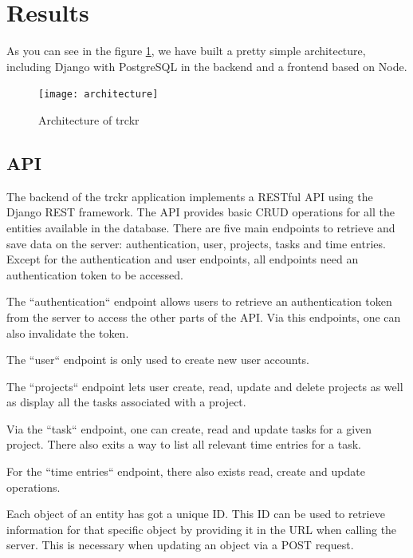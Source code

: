\documentclass[a4paper, 12pt, headsepline]{scrartcl}
\begin{document}
\section{Results}
As you can see in the figure \ref{fig:architecture}, we have built a pretty simple architecture,
including Django with PostgreSQL in the backend and a frontend based on Node.

\begin{figure}[h]
    \texttt{[image: architecture]}
    \caption{Architecture of trckr}
    \label{fig:architecture}
\end{figure}

\subsection{API}
The backend of the trckr application implements a RESTful API using the Django
REST framework. The API provides basic CRUD operations for all the entities
available in the database. There are five main endpoints to retrieve and save
data on the server: authentication, user, projects, tasks and time entries. Except
for the authentication and user endpoints, all endpoints need an authentication
token to be accessed.

The ``authentication`` endpoint allows users to retrieve an authentication token
from the server to access the other parts of the API. Via this endpoints, one
can also invalidate the token.

The ``user`` endpoint is only used to create new user accounts.

The ``projects`` endpoint lets user create, read, update and delete projects as
well as display all the tasks associated with a project.

Via the ``task`` endpoint, one can create, read and update tasks for a given project.
There also exits a way to list all relevant time entries for a task.

For the ``time entries`` endpoint, there also exists read, create and update operations.

Each object of an entity has got a unique ID. This ID can be used to retrieve
information for that specific object by providing it in the URL when calling the
server. This is necessary when updating an object via a POST request.
\end{document}
